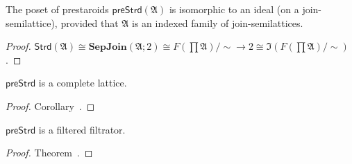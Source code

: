 \begin{cor}
  The poset of prestaroids
  $\mathsf{preStrd} (\mathfrak{A})$ is isomorphic to an ideal
  (on a join-semilattice), provided that $\mathfrak{A}$ is an indexed family
  of join-semilattices.
\end{cor}

\begin{proof}
  $\mathsf{Strd} (\mathfrak{A}) \cong \mathbf{SepJoin} (\mathfrak{A}; 2)
  \cong F \left( \prod \mathfrak{A} \right) / \sim \rightarrow 2 \cong
  \mathfrak{I} \left( F \left( \prod \mathfrak{A} \right) / \sim \right)$.
\end{proof}


\begin{cor}
$\mathsf{preStrd}$ is a complete lattice.
\end{cor}

\begin{proof}
Corollary~.
\end{proof}

\begin{cor}
$\mathsf{preStrd}$ is a filtered filtrator.
\end{cor}

\begin{proof}
Theorem~.
\end{proof}

